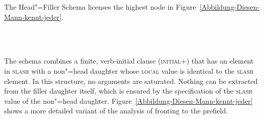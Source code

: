 \noindent
The Head"=Filler Schema licenses the highest node in Figure~\vref{Abbildung-Diesen-Mann-kennt-jeder}.
%
\begin{figure}
\begin{schema}[Head"=Filler Schema]
\label{hf-schemaa}
~\\\samepage
{} \impl\\
\end{schema}
\vspace{-\baselineskip}
\end{figure}%
The schema combines a finite, verb-initial clause (\textsc{initial}+) that has an element in \textsc{slash} with a non"=head daughter whose
\textsc{local} value is identical to the \textsc{slash} element.
In this structure, no arguments are saturated. Nothing can be extracted from the filler daughter itself, which is ensured
by the specification of the \textsc{slash} value of the non"=head daughter. Figure~\vref{Abbildung-Diesen-Mann-kennt-jeder} shows a more detailed
variant of the analysis of fronting to the prefield.
%
